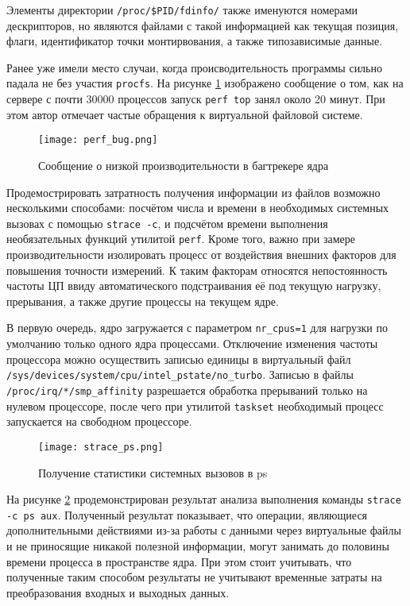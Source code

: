 Элементы директории \texttt{/proc/\$PID/fdinfo/} также именуются номерами
дескрипторов, но являются файлами с такой информацией как текущая позиция,
флаги, идентификатор точки монтирвования, а также типозависимые данные.

Ранее уже имели место случаи, когда происводительность программы сильно падала
не без участия \texttt{procfs}\cite{slowperf}. На рисунке \ref{fig:perf_bug}
изображено сообщение о том, как на сервере с почти 30000 процессов запуск
\texttt{perf top} занял около 20 минут. При этом автор отмечает частые обращения
к виртуальной файловой системе.

\begin{figure}
  \centering
  \texttt{[image: perf\_bug.png]}
  \caption{Сообщение о низкой производительности в багтрекере ядра \cite{slowperf}}
  \label{fig:perf_bug}
\end{figure}

Продемострировать затратность получения информации из файлов возможно несколькими
способами: посчётом числа и времени в необходимых системных вызовах с помощью
\texttt{strace -c}, и подсчётом времени выполнения необязательных функций
утилитой \texttt{perf}. Кроме того, важно при замере производительности
изолировать процесс от воздействия внешних факторов для повышения точности
измерений. К таким факторам относятся непостоянность частоты ЦП ввиду
автоматического подстраивания её под текущую нагрузку, прерывания, а также
другие процессы на текущем ядре\cite{kernelnewbies}.

В первую очередь, ядро загружается с параметром \texttt{nr\_cpus=1} для нагрузки
по умолчанию только одного ядра процессами\cite{kernel_docs}.
Отключение изменения частоты процессора можно осуществить записью единицы в
виртуальный файл
\texttt{/sys/devices/system/cpu/intel\_pstate/no\_turbo}. Записью в файлы
\texttt{/proc/irq/*/smp\_affinity} разрешается обработка прерываний только на
нулевом процессоре, после чего при утилитой \texttt{taskset} необходимый
процесс запускается на свободном процессоре.

\begin{figure}
  \centering
  \texttt{[image: strace\_ps.png]}
  \caption{Получение статистики системных вызовов в ps}
  \label{fig:strace_ps}
\end{figure}

На рисунке \ref{fig:strace_ps}
продемонстрирован результат анализа выполнения команды
\texttt{strace -c ps aux}. Полученный результат
показывает, что операции, являющиеся дополнительными действиями из-за работы с
данными через виртуальные файлы и не приносящие никакой полезной информации,
могут занимать до половины времени процесса в пространстве ядра. При этом стоит
учитывать, что полученные таким способом результаты не учитывают временные
затраты на преобразования входных и выходных данных. 

